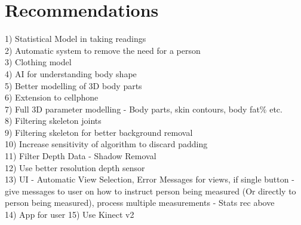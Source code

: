 \chapter{Recommendations} \label{recommendations}

1) Statistical Model in taking readings\\
2) Automatic system to remove the need for a person\\
3) Clothing model\\
4) AI for understanding body shape\\
5) Better modelling of 3D body parts\\
6) Extension to cellphone\\
7) Full 3D parameter modelling - Body parts, skin contours, body fat\% etc.\\
8) Filtering skeleton joints\\
9) Filtering skeleton for better background removal\\
10) Increase sensitivity of algorithm to discard padding\\
11) Filter Depth Data - Shadow Removal\\
12) Use better resolution depth sensor\\
13) UI - Automatic View Selection, Error Messages for views, if single button - give messages to user on how to instruct person being measured (Or directly to person being measured), process multiple measurements - Stats rec above\\ 
14) App for user
15) Use Kinect v2
